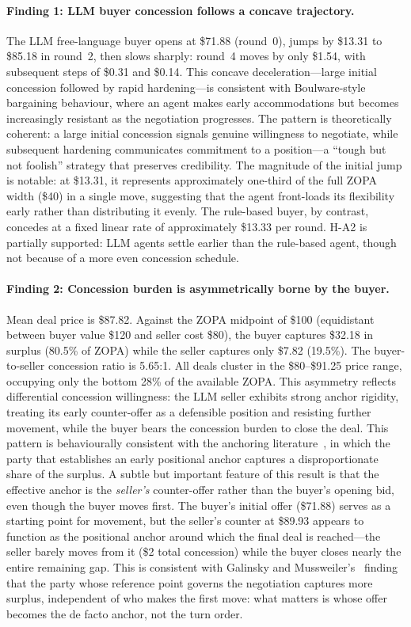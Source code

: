 \paragraph{Finding 1: LLM buyer concession follows a concave trajectory.}
The LLM free-language buyer opens at \$71.88 (round~0), jumps by \$13.31 to \$85.18 in round~2, then slows sharply: round~4 moves by only \$1.54, with subsequent steps of \$0.31 and \$0.14.  This concave deceleration---large initial concession followed by rapid hardening---is consistent with Boulware-style bargaining behaviour, where an agent makes early accommodations but becomes increasingly resistant as the negotiation progresses.  The pattern is theoretically coherent: a large initial concession signals genuine willingness to negotiate, while subsequent hardening communicates commitment to a position---a ``tough but not foolish'' strategy that preserves credibility.  The magnitude of the initial jump is notable: at \$13.31, it represents approximately one-third of the full ZOPA width (\$40) in a single move, suggesting that the agent front-loads its flexibility early rather than distributing it evenly.  The rule-based buyer, by contrast, concedes at a fixed linear rate of approximately \$13.33 per round.  H-A2 is partially supported: LLM agents settle earlier than the rule-based agent, though not because of a more even concession schedule.

\paragraph{Finding 2: Concession burden is asymmetrically borne by the buyer.}
Mean deal price is \$87.82.  Against the ZOPA midpoint of \$100 (equidistant between buyer value \$120 and seller cost \$80), the buyer captures \$32.18 in surplus (80.5\% of ZOPA) while the seller captures only \$7.82 (19.5\%).  The buyer-to-seller concession ratio is 5.65:1.  All deals cluster in the \$80--\$91.25 price range, occupying only the bottom 28\% of the available ZOPA.  This asymmetry reflects differential concession willingness: the LLM seller exhibits strong anchor rigidity, treating its early counter-offer as a defensible position and resisting further movement, while the buyer bears the concession burden to close the deal.  This pattern is behaviourally consistent with the anchoring literature~\cite{galinsky2001}, in which the party that establishes an early positional anchor captures a disproportionate share of the surplus.  A subtle but important feature of this result is that the effective anchor is the \emph{seller's} counter-offer rather than the buyer's opening bid, even though the buyer moves first.  The buyer's initial offer (\$71.88) serves as a starting point for movement, but the seller's counter at \$89.93 appears to function as the positional anchor around which the final deal is reached---the seller barely moves from it (\$2 total concession) while the buyer closes nearly the entire remaining gap.  This is consistent with Galinsky and Mussweiler's~\cite{galinsky2001} finding that the party whose reference point governs the negotiation captures more surplus, independent of who makes the first move: what matters is whose offer becomes the de facto anchor, not the turn order.

